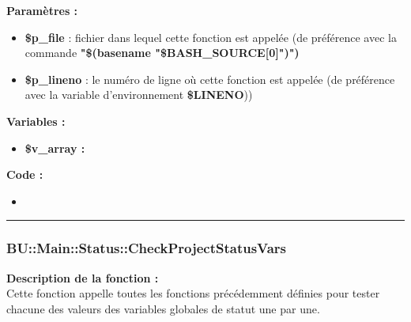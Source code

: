 \documentclass[a4paper,10pt]{article}
\begin{document}
\begin{justify}
    \textbf{Paramètres :}

    \begin{itemize}
        \item \color{orange}\textbf{\$p\_file}\color{white} : fichier dans lequel cette fonction est appelée (de préférence avec la commande \textbf{"\$(\color{gray}basename \color{white}"\color{orange}\$BASH\_SOURCE[0]\color{white}")")}\\

        \item \color{orange}\textbf{\$p\_lineno}\color{white} : le numéro de ligne où cette fonction est appelée (de préférence avec la variable d'environnement \textbf{\color{orange}\$LINENO}))
    \end{itemize}
\end{justify}

\begin{justify}
    \textbf{Variables :}

    \begin{itemize}
        \item \textbf{\color{orange}\$v\_array\color{white} :}
    \end{itemize}
\end{justify}

\begin{justify}
    \textbf{Code :}
    
    \begin{itemize}
        \item \textbf{}
    \end{itemize}
\end{justify}



\color{blue}\par\noindent\rule{\textwidth}{0.4pt}\color{white}

\color{blue}
\subsubsection{\color{mauve}BU::Main::Status::CheckProjectStatusVars}\color{white}

\begin{justify}
    \textbf{Description de la fonction :}\\
    Cette fonction appelle toutes les fonctions précédemment définies pour tester chacune des valeurs des variables globales de statut une par une.
\end{justify}
\end{document}
